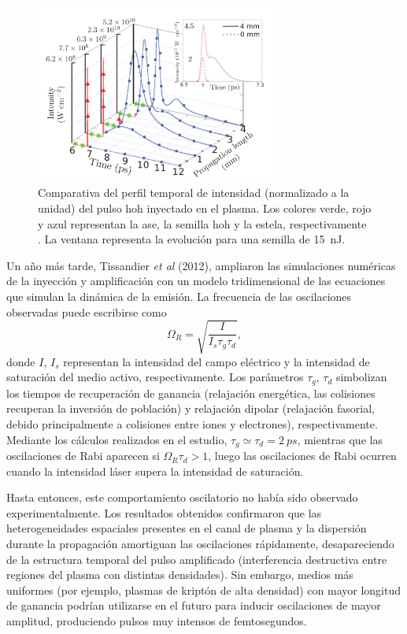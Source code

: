 \begin{figure}[htbp]
  \centering
  \includegraphics[width=0.7\textwidth]{Figuras/ch1_oliva11.png}
  \caption{Comparativa del perfil temporal de intensidad (normalizado a la unidad) del pulso \acrshort{hoh} inyectado en el plasma. Los colores verde, rojo y azul representan la \acrshort{ase}, la semilla \acrshort{hoh} y la estela, respectivamente \autocite{Oliva2011}. La ventana representa la evolución para una semilla de \qty{15}{nJ}.}
  \label{fig:1.26}
\end{figure}

Un año más tarde, Tissandier \emph{et al} (2012)\autocite{Tissandier2012}, ampliaron las simulaciones numéricas de la inyección y amplificación con un modelo tridimensional de las ecuaciones que simulan la dinámica de la emisión. La frecuencia de las oscilaciones observadas puede escribirse como \autocite{Tissandier2012}
\begin{equation}\label{eq:1.66}
  \Omega_{R} = \sqrt{\frac{I}{I_{s} \tau_{g} \tau_{d}}},
\end{equation}
donde $I$, $I_{s}$ representan la intensidad del campo eléctrico y la intensidad de saturación del medio activo, respectivamente. Los parámetros $\tau_{g}$, $\tau_{d}$ simbolizan los tiempos de recuperación de ganancia (relajación energética, las colisiones recuperan la inversión de población) y relajación dipolar (relajación fasorial, debido principalmente a colisiones entre iones y electrones), respectivamente. Mediante los cálculos realizados en el estudio, $\tau_{g} \simeq \tau_{d} = \qty{2}{ps}$, mientras que las oscilaciones de Rabi aparecen si $\Omega_{R} \tau_{d} > 1$, luego las oscilaciones de Rabi ocurren cuando la intensidad láser supera la intensidad de saturación.

Hasta entonces, este comportamiento oscilatorio no había sido observado experimentalmente. Los resultados obtenidos confirmaron que las heterogeneidades espaciales presentes en el canal de plasma y la dispersión durante la propagación amortiguan las oscilaciones rápidamente, desapareciendo de la estructura temporal del pulso amplificado (interferencia destructiva entre regiones del plasma con distintas densidades). Sin embargo, medios más uniformes (por ejemplo, plasmas de kriptón de alta densidad) con mayor longitud de ganancia podrían utilizarse en el futuro para inducir oscilaciones de mayor amplitud, produciendo pulsos muy intensos de femtosegundos.

